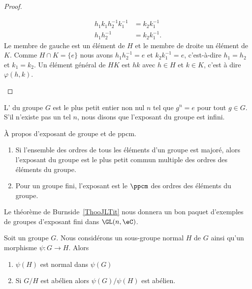 \begin{proof}
\begin{subproof}
\begin{subproof}
\begin{subequations}
\begin{align}
					h_1k_1h_2^{-1}k_1^{-1} & =k_2k_1^{-1}  \\
					h_1h_2^{-1}            & =k_2k_1^{-1}.
				\end{align}
			\end{subequations}
			Le membre de gauche est un élément de \( H\) et le membre de droite un élément de \( K\). Comme \( H\cap K=\{ e \}\) nous avons \( h_1h_2^{-1}=e\) et \( k_2k_1^{-1}=e\), c'est-à-dire \( h_1=h_2\) et \( k_1=k_2\).
			\spitem[Surjectif]
			Un élément général de \( HK\) est \( hk\) avec \( h\in H\) et \( k\in K\), c'est à dire \( \varphi(h,k)\).
		\end{subproof}
	\end{subproof}
\end{proof}

\begin{definition}  \label{DefvtSAyb}
	L' du groupe \( G\) est le plus petit entier non nul \( n\) tel que \( g^n=e\) pour tout \( g\in G\). S'il n'existe pas un tel \( n\), nous disons que l'exposant du groupe est infini.
\end{definition}

\begin{proposition} \label{PROPooSWHHooOzqWkw}
	À propos d'exposant de groupe et de ppcm.
	\begin{enumerate}
		\item
		      Si l'ensemble des ordres de tous les éléments d'un groupe est majoré, alors l'exposant du groupe est le plus petit commun multiple des ordres des éléments du groupe.
		\item
		      Pour un groupe fini, l'exposant est le \( \ppcm\) des ordres des éléments du groupe.
	\end{enumerate}
\end{proposition}

Le théorème de Burnside~\ref{ThooJLTit} nous donnera un bon paquet d'exemples de groupes d'exposant fini dans \( \GL(n,\eC)\).

\begin{proposition} \label{PropSRMJooIDPBoW}
	Soit un groupe \( G\). Nous considérons un sous-groupe normal \( H\) de \( G\) ainsi qu'un morphisme \( \psi\colon G\to H\). Alors
	\begin{enumerate}
		\item
		      \( \psi(H)\) est normal dans \( \psi(G)\)
		\item
		      Si \( G/H\) est abélien alors \( \psi(G)/\psi(H)\) est abélien.
	\end{enumerate}
\end{proposition}

